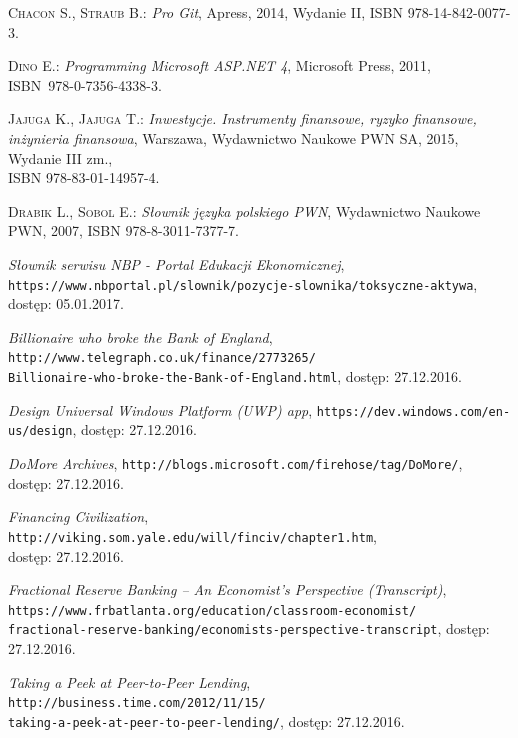 \documentclass[a4paper,twoside,titlepage,openright]{book}
\begin{document}
\begin{thebibliography}{99}

 \textsc{Chacon S., Straub B.:}
\textit{Pro Git}, Apress, 2014, Wydanie II, ISBN 978-14-842-0077-3.

 \textsc{Dino E.:}
\textit{Programming Microsoft ASP.NET 4}, Microsoft Press, 2011, \\ISBN~978-0-7356-4338-3.

 \textsc{Jajuga K., Jajuga T.:}
\textit{Inwestycje. Instrumenty finansowe, ryzyko finansowe, inżynieria finansowa}, Warszawa, Wydawnictwo Naukowe PWN SA, 2015, Wydanie III zm., \\ISBN 978-83-01-14957-4.

 \textsc{Drabik L., Sobol	E.:}
\textit{Słownik języka polskiego PWN}, Wydawnictwo Naukowe PWN, 2007, ISBN 978-8-3011-7377-7.

 \textit{Słownik serwisu NBP - Portal Edukacji Ekonomicznej}, \\
\texttt{https://www.nbportal.pl/slownik/pozycje-slownika/toksyczne-aktywa}, \\dostęp: 05.01.2017.

 \textit{Billionaire who broke the Bank of England}, 
\texttt{http://www.telegraph.co.uk/finance/2773265/\\Billionaire-who-broke-the-Bank-of-England.html}, dostęp: 27.12.2016.

 \textit{Design Universal Windows Platform (UWP) app}, 
\texttt{https://dev.windows.com/en-us/design}, dostęp: 27.12.2016.

 \textit{DoMore Archives}, 
\texttt{http://blogs.microsoft.com/firehose/tag/DoMore/}, \\dostęp: 27.12.2016.

 \textit{Financing Civilization}, 
\texttt{http://viking.som.yale.edu/will/finciv/chapter1.htm}, \\dostęp: 27.12.2016.

 \textit{Fractional Reserve Banking -- An Economist's Perspective (Transcript)}, \\
\texttt{https://www.frbatlanta.org/education/classroom-economist/\\fractional-reserve-banking/economists-perspective-transcript}, dostęp: 27.12.2016.

 \textit{Taking a Peek at Peer-to-Peer Lending}, 
\texttt{http://business.time.com/2012/11/15/\\taking-a-peek-at-peer-to-peer-lending/}, dostęp: 27.12.2016.


\end{thebibliography}
\end{document}
